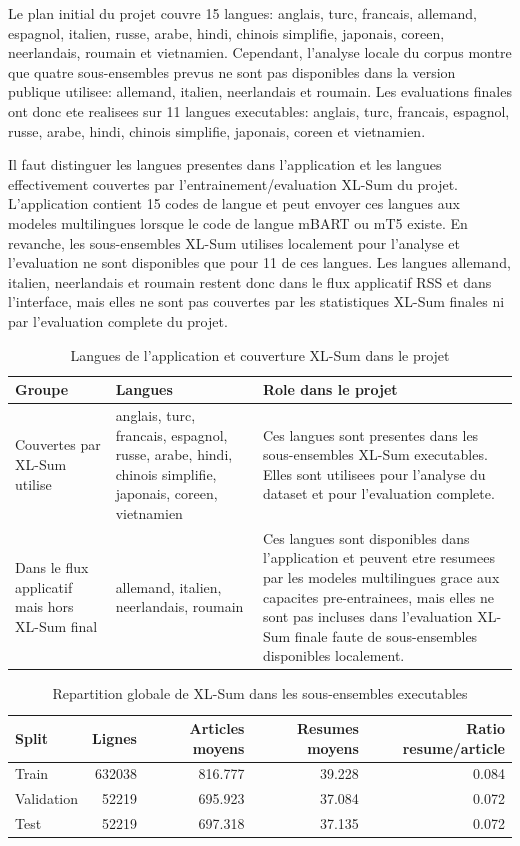 Le plan initial du projet couvre 15 langues: anglais, turc, francais, allemand, espagnol, italien, russe, arabe, hindi, chinois simplifie, japonais, coreen, neerlandais, roumain et vietnamien. Cependant, l'analyse locale du corpus montre que quatre sous-ensembles prevus ne sont pas disponibles dans la version publique utilisee: allemand, italien, neerlandais et roumain. Les evaluations finales ont donc ete realisees sur 11 langues executables: anglais, turc, francais, espagnol, russe, arabe, hindi, chinois simplifie, japonais, coreen et vietnamien.

Il faut distinguer les langues presentes dans l'application et les langues effectivement couvertes par l'entrainement/evaluation XL-Sum du projet. L'application contient 15 codes de langue et peut envoyer ces langues aux modeles multilingues lorsque le code de langue mBART ou mT5 existe. En revanche, les sous-ensembles XL-Sum utilises localement pour l'analyse et l'evaluation ne sont disponibles que pour 11 de ces langues. Les langues allemand, italien, neerlandais et roumain restent donc dans le flux applicatif RSS et dans l'interface, mais elles ne sont pas couvertes par les statistiques XL-Sum finales ni par l'evaluation complete du projet.

\begin{table}[t]
\caption{Langues de l'application et couverture XL-Sum dans le projet}
\label{tab:language-training-flow-coverage}
\centering
\begin{tabular}{|p{3.0cm}|p{5.0cm}|p{5.0cm}|}
\hline
\textbf{Groupe} & \textbf{Langues} & \textbf{Role dans le projet} \\
\hline
Couvertes par XL-Sum utilise & anglais, turc, francais, espagnol, russe, arabe, hindi, chinois simplifie, japonais, coreen, vietnamien & Ces langues sont presentes dans les sous-ensembles XL-Sum executables. Elles sont utilisees pour l'analyse du dataset et pour l'evaluation complete. \\
\hline
Dans le flux applicatif mais hors XL-Sum final & allemand, italien, neerlandais, roumain & Ces langues sont disponibles dans l'application et peuvent etre resumees par les modeles multilingues grace aux capacites pre-entrainees, mais elles ne sont pas incluses dans l'evaluation XL-Sum finale faute de sous-ensembles disponibles localement. \\
\hline
\end{tabular}
\end{table}

\begin{table}[t]
\caption{Repartition globale de XL-Sum dans les sous-ensembles executables}
\label{tab:xlsum-split-counts}
\centering
\begin{tabular}{|l|r|r|r|r|}
\hline
\textbf{Split} & \textbf{Lignes} & \textbf{Articles moyens} & \textbf{Resumes moyens} & \textbf{Ratio resume/article} \\
\hline
Train & 632038 & 816.777 & 39.228 & 0.084 \\
\hline
Validation & 52219 & 695.923 & 37.084 & 0.072 \\
\hline
Test & 52219 & 697.318 & 37.135 & 0.072 \\
\hline
\end{tabular}
\end{table}

